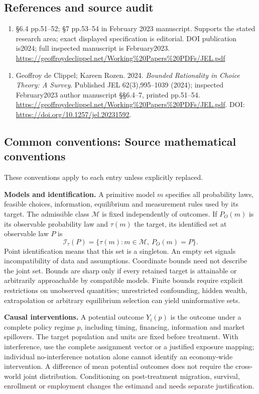 \documentclass[11pt,a4paper]{article}
\begin{document}
\subsection*{References and source audit}
\begin{enumerate}
\item §6.4 pp.51–52; §7 pp.53–54 in February 2023 manuscript. Supports the stated research area; exact displayed specification is editorial. DOI publication is2024; full inspected manuscript is February2023. \url{https://geoffroydeclippel.net/Working%20Papers%20PDFs/JEL.pdf}
\end{enumerate}
\begin{enumerate}\raggedright
\item\hypertarget{definitions:source:30007554:1}{} Geoffroy de Clippel; Kareen Rozen. 2024. \emph{Bounded Rationality in Choice Theory: A Survey}. Published JEL 62(3),995–1039 (2024); inspected February2023 author manuscript §§6.4–7, printed pp.51–54.
\url{https://geoffroydeclippel.net/Working%20Papers%20PDFs/JEL.pdf}.
DOI: \url{https://doi.org/10.1257/jel.20231592}.
\end{enumerate}

\subsection*{Common conventions: Source mathematical conventions}

These conventions apply to each entry unless explicitly replaced.

\textbf{Models and identification.} A primitive model \(m\) specifies all probability laws, feasible choices, information, equilibrium and measurement rules used by its target. The admissible class \(\mathcal M\) is fixed independently of outcomes. If \(P_O(m)\) is its observable probability law and \(\tau(m)\) the target, its identified set at observable law \(P\) is
\[
 \mathcal I_\tau(P)=\{\tau(m):m\in\mathcal M,\ P_O(m)=P\}.
\]
Point identification means that this set is a singleton. An empty set signals incompatibility of data and assumptions. Coordinate bounds need not describe the joint set. Bounds are sharp only if every retained target is attainable or arbitrarily approachable by compatible models. Finite bounds require explicit restrictions on unobserved quantities; unrestricted confounding, hidden wealth, extrapolation or arbitrary equilibrium selection can yield uninformative sets.

\textbf{Causal interventions.} A potential outcome \(Y_i(p)\) is the outcome under a complete policy regime \(p\), including timing, financing, information and market spillovers. The target population and units are fixed before treatment. With interference, use the complete assignment vector or a justified exposure mapping; individual no-interference notation alone cannot identify an economy-wide intervention. A difference of mean potential outcomes does not require the cross-world joint distribution. Conditioning on post-treatment migration, survival, enrollment or employment changes the estimand and needs separate justification.
\end{document}
